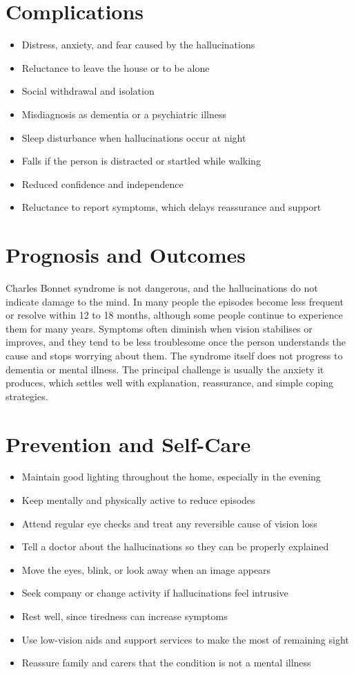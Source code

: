 \section*{Complications}
\begin{itemize}
    \item Distress, anxiety, and fear caused by the hallucinations
    \item Reluctance to leave the house or to be alone
    \item Social withdrawal and isolation
    \item Misdiagnosis as dementia or a psychiatric illness
    \item Sleep disturbance when hallucinations occur at night
    \item Falls if the person is distracted or startled while walking
    \item Reduced confidence and independence
    \item Reluctance to report symptoms, which delays reassurance and support
\end{itemize}

\section*{Prognosis and Outcomes}
Charles Bonnet syndrome is not dangerous, and the hallucinations do not indicate damage to the mind. In many people the episodes become less frequent or resolve within 12 to 18 months, although some people continue to experience them for many years. Symptoms often diminish when vision stabilises or improves, and they tend to be less troublesome once the person understands the cause and stops worrying about them. The syndrome itself does not progress to dementia or mental illness. The principal challenge is usually the anxiety it produces, which settles well with explanation, reassurance, and simple coping strategies.

\section*{Prevention and Self-Care}
\begin{itemize}
    \item Maintain good lighting throughout the home, especially in the evening
    \item Keep mentally and physically active to reduce episodes
    \item Attend regular eye checks and treat any reversible cause of vision loss
    \item Tell a doctor about the hallucinations so they can be properly explained
    \item Move the eyes, blink, or look away when an image appears
    \item Seek company or change activity if hallucinations feel intrusive
    \item Rest well, since tiredness can increase symptoms
    \item Use low-vision aids and support services to make the most of remaining sight
    \item Reassure family and carers that the condition is not a mental illness
\end{itemize}

